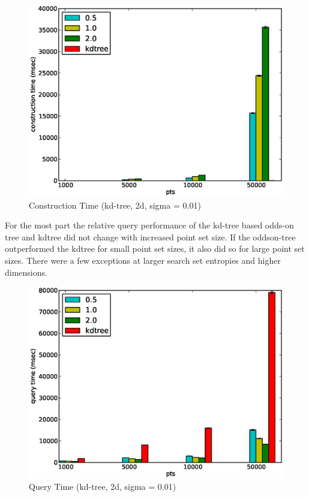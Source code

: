 \documentclass[mcs]{scsthesis}
\begin{document}
\begin{figure}
\begin{center}
\includegraphics[scale=0.5]{diagrams/2d_group_bypts_sigma0.01_ctime.eps}
\caption{Construction Time (kd-tree, 2d, sigma = 0.01)}
\label{fig:point_set_size_ctime}
\end{center}
\end{figure}

For the most part the relative query performance of the kd-tree based odds-on
tree and kdtree did not change with increased point set size. If the oddson-tree
outperformed the kdtree for small point set sizes, it also did so for large
point set sizes. There were a few exceptions at larger search set entropies and
higher dimensions.

\begin{figure}
\begin{center}
\includegraphics[scale=0.5]{diagrams/2d_group_bypts_sigma0.01_qtime.eps}
\caption{Query Time (kd-tree, 2d, sigma = 0.01)}
\label{fig:point_set_size_qtime}
\end{center}
\end{figure}
\end{document}
